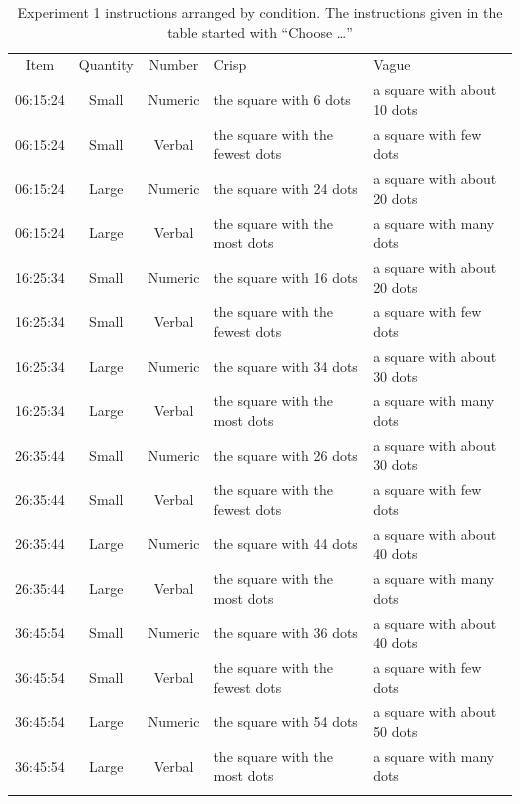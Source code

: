 \documentclass[ %
  graybox       %
 ,envcountchap  %
 ,sectrefs      %
]{svmono}
\begin{document}
\begin{table}[htbp]
\centering
\caption{Experiment 1 instructions arranged by condition. The instructions given in the table started with ``Choose \ldots''}
\label{instructionsC-exp-1}
\begin{tabular}{cccll}
\hline\noalign{\smallskip}
Item & Quantity & Number & Crisp & Vague\\
\noalign{\smallskip}\hline\noalign{\smallskip}
06:15:24 & Small & Numeric & the square with 6 dots & a square with about 10 dots\\
06:15:24 & Small & Verbal & the square with the fewest dots & a square with few dots\\
06:15:24 & Large & Numeric & the square with 24 dots & a square with about 20 dots\\
06:15:24 & Large & Verbal & the square with the most dots & a square with many dots\\
\noalign{\smallskip}\hline\noalign{\smallskip}
16:25:34 & Small & Numeric & the square with 16 dots & a square with about 20 dots\\
16:25:34 & Small & Verbal & the square with the fewest dots & a square with few dots\\
16:25:34 & Large & Numeric & the square with 34 dots & a square with about 30 dots\\
16:25:34 & Large & Verbal & the square with the most dots & a square with many dots\\
\noalign{\smallskip}\hline\noalign{\smallskip}
26:35:44 & Small & Numeric & the square with 26 dots & a square with about 30 dots\\
26:35:44 & Small & Verbal & the square with the fewest dots & a square with few dots\\
26:35:44 & Large & Numeric & the square with 44 dots & a square with about 40 dots\\
26:35:44 & Large & Verbal & the square with the most dots & a square with many dots\\
\noalign{\smallskip}\hline\noalign{\smallskip}
36:45:54 & Small & Numeric & the square with 36 dots & a square with about 40 dots\\
36:45:54 & Small & Verbal & the square with the fewest dots & a square with few dots\\
36:45:54 & Large & Numeric & the square with 54 dots & a square with about 50 dots\\
36:45:54 & Large & Verbal & the square with the most dots & a square with many dots\\
\noalign{\smallskip}\hline
\end{tabular}
\end{table}
\end{document}
